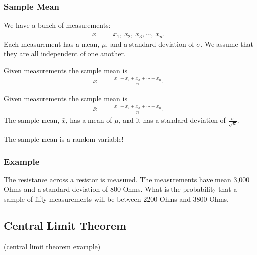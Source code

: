 \begin{frame}
  \frametitle{Sample Mean}

  We have a bunch of measurements:
  \begin{eqnarray*}
    \bar{x} & = & x_1,~x_2,~x_3,\cdots,~x_n.
  \end{eqnarray*}
  Each measurement has a mean, $\mu$, and a standard deviation of
  $\sigma$. We assume that they are all independent of one another.
  
  {
    \begin{definition}
      Given measurements the sample mean is 
      \begin{eqnarray*}
        \bar{x} & = & \frac{x_1+x_2+x_3+\cdots+x_n}{n}.
      \end{eqnarray*}
    \end{definition}
  }

  {
    \begin{definition}
      Given measurements the sample mean is 
      \begin{eqnarray*}
        \bar{x} & = & \frac{x_1+x_2+x_3+\cdots+x_n}{n}.
      \end{eqnarray*}
      The sample mean, $\bar{x}$,  has a mean of $\mu$, and it has a
      standard deviation of $\frac{\sigma}{\sqrt{n}}$.
    \end{definition}
  }


  {
    The sample mean is a random variable!
  }

\end{frame}





\begin{frame}
  \frametitle{Example}

  The resistance across a resistor is measured. The measurements have
  mean 3,000 Ohms and a standard deviation of 800 Ohms. What is the
  probability that a sample of fifty measurements will be between 2200
  Ohms and 3800 Ohms.

\end{frame}



\subsection{Central Limit Theorem}


\begin{frame}
  (central limit theorem example)
\end{frame}




